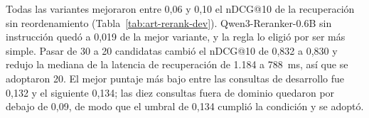 Todas las variantes mejoraron entre 0,06 y 0,10 el nDCG@10 de la recuperación sin reordenamiento (Tabla~\ref{tab:art-rerank-dev}). Qwen3-Reranker-0.6B sin instrucción quedó a 0,019 de la mejor variante, y la regla lo eligió por ser más simple. Pasar de 30 a 20 candidatas cambió el nDCG@10 de 0,832 a 0,830 y redujo la mediana de la latencia de recuperación de 1.184 a 788~ms, así que se adoptaron 20. El mejor puntaje más bajo entre las consultas de desarrollo fue 0,132 y el siguiente 0,134; las diez consultas fuera de dominio quedaron por debajo de 0,09, de modo que el umbral de 0,134 cumplió la condición y se adoptó.
